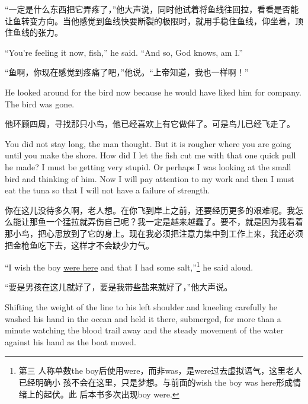 \begin{paracol}{2}
\switchcolumn

“一定是什么东西把它弄疼了，”他大声说，同时他试着将鱼线往回拉，看看是否能让鱼转变方向。当他感觉到鱼线快要断裂的极限时，就用手稳住鱼线，仰坐着，顶住鱼线的张力。

\switchcolumn*

``You're feeling it now, fish,'' he said. ``And so, God knows, am I.''

\switchcolumn

“鱼啊，你现在感觉到疼痛了吧，”他说。“上帝知道，我也一样啊！”

\switchcolumn*

He looked around for the bird now because he would have liked him for
\gls{company}. The bird was gone.

\switchcolumn

他环顾四周，寻找那只小鸟，他已经喜欢上有它做伴了。可是鸟儿已经飞走了。

\switchcolumn*

You did not stay long, the man thought. But it is rougher where you are
going until you make the shore. How did I let the fish cut me with that one
quick pull he made? I must be getting very stupid. Or perhaps I was looking
at the small bird and thinking of him. Now I will pay \gls{attention} to my work
and then I must eat the tuna so that I will not have a \gls{failure} of strength.

\switchcolumn

你在这儿没待多久啊，老人想。在你飞到岸上之前，还要经历更多的艰难呢。我怎么能让那鱼一个猛拉就弄伤自己呢？我一定是越来越蠢了。要不，就是因为我看着那小鸟，把心思放到了它的身上。现在我必须把注意力集中到工作上来，我还必须把金枪鱼吃下去，这样才不会缺少力气。

\switchcolumn*

``I wish the boy \uline{were here} and that I had some salt,''\footnote{第三
  人称单数the boy后使用were，而非was，是were过去虚拟语气，这里老人已经明确小
  孩不会在这里，只是梦想。与前面的wish the boy was here形成情绪上的起伏。此
  后本书多次出现boy were.}
he said aloud.

\switchcolumn

“要是男孩在这儿就好了，要是我带些盐来就好了，”他大声说。

\switchcolumn*

Shifting the weight of the line to his left shoulder and \gls{kneel}ing
carefully he washed his hand in the ocean and held it there,
\gls{submerged}, for more than a minute watching the blood trail away and
the steady movement of the water against his hand as the boat moved.


\end{paracol}
